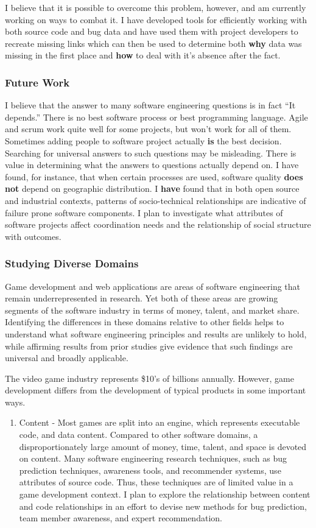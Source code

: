 \documentclass[10pt]{article}
\newcommand\Section[1]{\subsubsection*{\large #1}}
\newcommand\Subsection[1]{\subsubsection*{\small #1}}
\begin{document}
\begin{small}
I believe that it is possible to overcome this problem, however, and am
currently working on ways to combat it.  I have developed tools for efficiently
working with both source code and bug data and have used them with project
developers to recreate missing links which can then be used to determine both
\textbf{why} data was missing in the first place and \textbf{how} to deal with
it's absence after the fact.

\Section{Future Work}

I believe that the answer to many software engineering questions is in fact
``It depends.'' There is no best software process or best programming
language.  Agile and scrum work quite well for some projects, but won't work for all
of them.  Sometimes adding people to software project actually \textbf{is} the
best decision.  Searching for universal answers to such questions may be
misleading.  There is value in determining what the answers to questions
actually depend on.  I have found, for instance, that when certain processes
are used, software quality \textbf{does not} depend on geographic distribution.
I \textbf{have} found that in both open source and industrial contexts,
patterns of socio-technical relationships are indicative of failure prone
software components.  I plan to investigate what attributes of software
projects affect coordination needs and the relationship of social structure 
with outcomes.

\Subsection{Studying Diverse Domains}

Game development and web applications are areas of software engineering that
remain underrepresented in research.  Yet both of these areas are
growing segments of the software industry in terms of money, talent, and market
share.  Identifying the differences in these domains relative to other
fields helps to understand what software engineering principles and
results are unlikely to hold, while affirming results from prior studies give
evidence that such findings are universal and broadly applicable.

The video game industry represents \$10's of billions annually. However, game
development differs from the development of typical products in some important
ways.

\begin{enumerate}

\item Content - Most games are split into an engine, which represents executable code,
    and data content.  Compared to other software domains, a disproportionately large
    amount of money, time, talent, and space is devoted on content.  
    Many software engineering research techniques, such as
    bug prediction techniques, awareness tools, and recommender systems, use attributes
    of source code.  Thus, these techniques are of limited value
    in a game development context.  I plan to explore the relationship between content
    and code relationships in an effort to devise new
    methods for bug prediction, team member awareness, and expert recommendation.


\end{enumerate}
\end{small}
\end{document}
